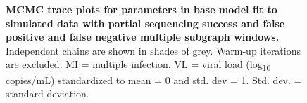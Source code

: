 \documentclass[10pt,letterpaper]{article}
\begin{document}
\begin{figure}[!ht]
\caption{{\bf MCMC trace plots for parameters in base model fit to simulated data with partial sequencing success and false positive and false negative multiple subgraph windows.} Independent chains are shown in shades of grey. Warm-up iterations are excluded. MI = multiple infection. VL = viral load (log\textsubscript{10} copies/mL) standardized to mean = 0 and std. dev = 1. Std. dev. = standard deviation.  }
\end{figure}
\end{document}
